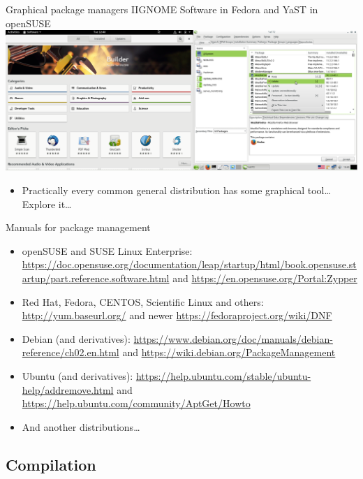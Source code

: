 \documentclass[compress, ucs, xelatex, 11pt, xcolor=svgnames,
  hyperref={
    bookmarks=true,
    unicode=true,
    colorlinks=true,
    pdftitle={Linux, command line and MetaCentrum},
    plainpages=false,
    pdfauthor={Vojtech Zeisek},
    pdfsubject={Course about use of Linux command line, writing shell scripts and using MetaCentrum of CESNET},
    pdfcreator={XeLaTeX},
    pdfkeywords={Linux, GNU, BASH, shell, command line, MetaCentrum},
    linkcolor=DarkRed,
    anchorcolor=DarkBlue,
    citecolor=Indigo,
    filecolor=NavyBlue,
    menucolor=DarkMagenta,
    urlcolor=DarkBlue,
    pdftex},
  url={hyphens, lowtilde} %
  ]{beamer}
\begin{document}
\begin{frame}{Graphical package managers II}{GNOME Software in Fedora and YaST in openSUSE}
  \includegraphics[width=\textwidth]{software_managers_fedora_suse.png}
  \begin{itemize}
    \item Practically every common general distribution has some graphical tool\ldots{ }Explore it\ldots
  \end{itemize}
\end{frame}

\begin{frame}{Manuals for package management}
  \begin{itemize}
    \item openSUSE and SUSE Linux Enterprise: \url{https://doc.opensuse.org/documentation/leap/startup/html/book.opensuse.startup/part.reference.software.html} and \url{https://en.opensuse.org/Portal:Zypper}
    \item Red Hat, Fedora, CENTOS, Scientific Linux and others: \url{http://yum.baseurl.org/} and newer \url{https://fedoraproject.org/wiki/DNF}
    \item Debian (and derivatives): \url{https://www.debian.org/doc/manuals/debian-reference/ch02.en.html} and \url{https://wiki.debian.org/PackageManagement}
    \item Ubuntu (and derivatives): \url{https://help.ubuntu.com/stable/ubuntu-help/addremove.html} and \url{https://help.ubuntu.com/community/AptGet/Howto}
    \item And another distributions\ldots
  \end{itemize}
\end{frame}

\subsection{Compilation}
\end{document}

